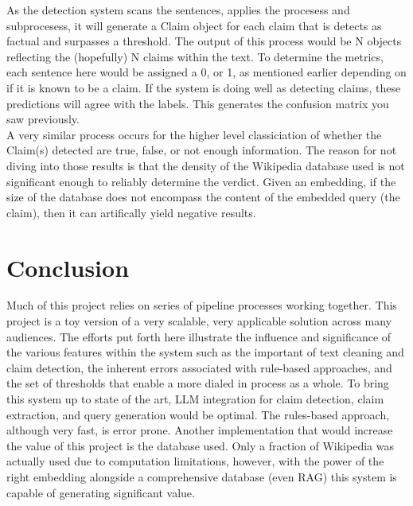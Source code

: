 \documentclass[11pt,letterpaper]{article}
\newcommand{\conclusion}[1]{
    \section*{Conclusion}
    \addcontentsline{toc}{section}{Conclusion}
    #1
}
\begin{document}
{    As the detection system scans the sentences, applies the procesess and subprocesess, it will generate a Claim object for each claim that is detects as factual and surpasses a threshold. The output of this process would be N objects reflecting the (hopefully) N claims within the text. To determine the metrics, each sentence here would be assigned a 0, or 1, as mentioned earlier depending on if it is known to be a claim. If the system is doing well as detecting claims, these predictions will agree with the labels. This generates the confusion matrix you saw previously. \\

    A very similar process occurs for the higher level classiciation of whether the Claim(s) detected are true, false, or not enough information. The reason for not diving into those results is that the density of the Wikipedia database used is not significant enough to reliably determine the verdict. Given an embedding, if the size of the database does not encompass the content of the embedded query (the claim), then it can artifically yield negative results. \\

}

\conclusion{

    Much of this project relies on series of pipeline processes working together. This project is a toy version of a very scalable, very applicable solution across many audiences. The efforts put forth here illustrate the influence and significance of the various features within the system such as the important of text cleaning and claim detection, the inherent errors associated with rule-based approaches, and the set of thresholds that enable a more dialed in process as a whole. To bring this system up to state of the art, LLM integration for claim detection, claim extraction, and query generation would be optimal. The rules-based approach, although very fast, is error prone. Another implementation that would increase the value of this project is the database used. Only a fraction of Wikipedia was actually used due to computation limitations, however, with the power of the right embedding alongside a comprehensive database (even RAG) this system is capable of generating significant value. \\
}



\end{document}
